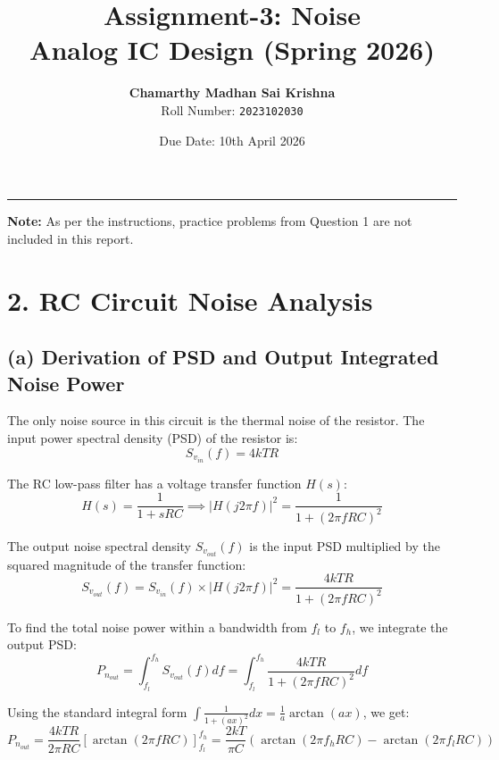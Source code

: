\documentclass[12pt, a4paper]{article}
\title{\textbf{Assignment-3: Noise}\\ \large Analog IC Design (Spring 2026)}
\author{
    \textbf{Chamarthy Madhan Sai Krishna} \\ 
    Roll Number: \texttt{2023102030}
}
\date{Due Date: 10th April 2026}
\begin{document}
\maketitle
\thispagestyle{fancy}

\hrule
\vspace{0.5cm}
\noindent \textbf{Note:} As per the instructions, practice problems from Question 1 are not included in this report.
\vspace{0.5cm}

\section*{2. RC Circuit Noise Analysis}

\subsection*{(a) Derivation of PSD and Output Integrated Noise Power}
The only noise source in this circuit is the thermal noise of the resistor. The input power spectral density (PSD) of the resistor is:
\begin{equation}
    S_{v_{in}}(f) = 4kTR
\end{equation}

The RC low-pass filter has a voltage transfer function $H(s)$:
\begin{equation}
    H(s) = \frac{1}{1 + sRC} \implies |H(j2\pi f)|^2 = \frac{1}{1 + (2\pi fRC)^2}
\end{equation}

The output noise spectral density $S_{v_{out}}(f)$ is the input PSD multiplied by the squared magnitude of the transfer function:
\begin{equation}
    S_{v_{out}}(f) = S_{v_{in}}(f) \times |H(j2\pi f)|^2 = \frac{4kTR}{1 + (2\pi fRC)^2}
\end{equation}

To find the total noise power within a bandwidth from $f_l$ to $f_h$, we integrate the output PSD:
\begin{equation}
    P_{n_{out}} = \int_{f_l}^{f_h} S_{v_{out}}(f) df = \int_{f_l}^{f_h} \frac{4kTR}{1 + (2\pi fRC)^2} df
\end{equation}

Using the standard integral form $\int \frac{1}{1 + (ax)^2} dx = \frac{1}{a} \arctan(ax)$, we get:
\begin{equation}
    P_{n_{out}} = \frac{4kTR}{2\pi RC} \left[ \arctan(2\pi fRC) \right]_{f_l}^{f_h} = \frac{2kT}{\pi C} \left( \arctan(2\pi f_hRC) - \arctan(2\pi f_lRC) \right)
\end{equation}
\end{document}
